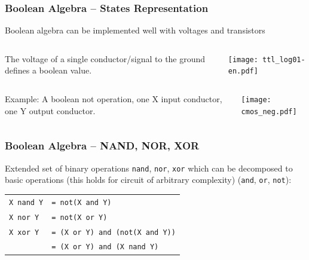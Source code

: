 \documentclass{beamer}
\begin{document}
\begin{frame}
\frametitle{Boolean Algebra -- States Representation}

Boolean algebra can be implemented well with voltages and transistors

\begin{columns}
\begin{column}{0.45\textwidth}
The voltage of a single conductor/signal to the ground defines a boolean value.
\end{column}
\begin{column}{0.55\textwidth}
\begin{center}
   \texttt{[image: ttl\_log01-en.pdf]}
\end{center}
\end{column}
\end{columns}

\begin{columns}
\begin{column}{0.45\textwidth}
Example: A boolean not operation, one X input conductor, one Y output conductor.
\end{column}
\begin{column}{0.55\textwidth}  
\begin{center}
   \texttt{[image: cmos\_neg.pdf]}
\end{center}
\end{column}
\end{columns}

\end{frame}

\begin{frame}
\frametitle{Boolean Algebra -- NAND, NOR, XOR}

Extended set of binary operations \texttt{nand}, \texttt{nor}, \texttt{xor} which can be decomposed to basic operations (this holds for circuit of arbitrary complexity) (\texttt{and}, \texttt{or}, \texttt{not}):

\begin{tabular}{ll}
\texttt{X nand Y} & \texttt{= not(X and Y)}\\
\texttt{X nor Y} & \texttt{= not(X or Y)}\\
\texttt{X xor Y} & \texttt{= (X or Y) and (not(X and Y))}\\
& \texttt{= (X or Y) and (X nand Y)}\\
\end{tabular}


\end{frame}
\end{document}
